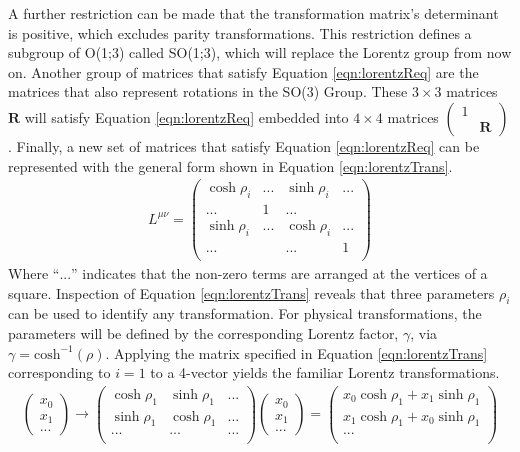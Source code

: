A further restriction can be made that the transformation matrix's determinant is positive, which excludes parity transformations.
This restriction defines a subgroup of O(1;3) called SO(1;3), which will replace the Lorentz group from now on.
Another group of matrices that satisfy Equation \ref{eqn:lorentzReq} are the matrices that also represent rotations in the SO(3) Group.
These $3\times3$ matrices $\pmb R$ will satisfy Equation \ref{eqn:lorentzReq} embedded into $4\times4$ matrices $\begin{pmatrix}1&\\&\pmb R\end{pmatrix}$. \check
Finally, a new set of matrices that satisfy Equation \ref{eqn:lorentzReq} can be represented with the general form shown in Equation \ref{eqn:lorentzTrans}.
\begin{equation}\begin{split}\label{eqn:lorentzTrans}
L^{\mu\nu} = 
\begin{pmatrix}
\cosh\rho_i & ... & \sinh\rho_i & ... \\
... & 1 & ... \\
\sinh\rho_i & ... & \cosh\rho_i & ... \\
... & & ... & 1 \\
\end{pmatrix}
\end{split}\end{equation} 
Where ``$...$'' indicates that the non-zero terms are arranged at the vertices of a square.
Inspection of Equation \ref{eqn:lorentzTrans} reveals that three parameters $\rho_i$ can be used to identify any transformation.
For physical transformations, the parameters will be defined by the corresponding Lorentz factor, $\gamma$, via $\gamma=\text{cosh}^{-1}(\rho)$. \check
Applying the matrix specified in Equation \ref{eqn:lorentzTrans} corresponding to $i=1$ to a 4-vector yields the familiar Lorentz transformations.
\begin{equation}\begin{split}
\begin{pmatrix}x_0\\x_1\\...\end{pmatrix}\to
\begin{pmatrix}
    \cosh\rho_1 & \sinh\rho_1 & ... \\
    \sinh\rho_1 & \cosh\rho_1 & ... \\
    ... & ... & ... \\
\end{pmatrix}
\begin{pmatrix}x_0\\x_1\\...\end{pmatrix} =
\begin{pmatrix}
    x_0\cosh{\rho_1}+x_1\sinh{\rho_1} \\
    x_1\cosh{\rho_1}+x_0\sinh{\rho_1} \\
    ... \\
\end{pmatrix}
\end{split}\end{equation} 
